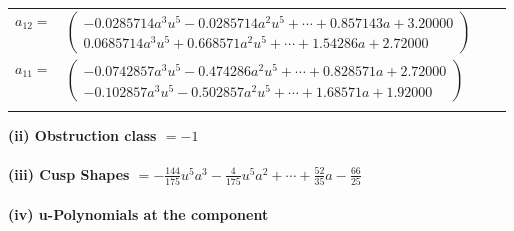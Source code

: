\documentclass[1p]{elsarticle_modified}
\theoremstyle{definition}
\begin{document}
\begin{tabular}{m{7pt} m{180pt} m{7pt} m{180pt} }
\flushright $a_{12}=$&$\begin{pmatrix}-0.0285714 a^{3} u^{5}-0.0285714 a^{2} u^{5}+\cdots+0.857143 a+3.20000\\0.0685714 a^{3} u^{5}+0.668571 a^{2} u^{5}+\cdots+1.54286 a+2.72000\end{pmatrix}$ \\
\flushright $a_{11}=$&$\begin{pmatrix}-0.0742857 a^{3} u^{5}-0.474286 a^{2} u^{5}+\cdots+0.828571 a+2.72000\\-0.102857 a^{3} u^{5}-0.502857 a^{2} u^{5}+\cdots+1.68571 a+1.92000\end{pmatrix}$\\&\end{tabular}
\flushleft \textbf{(ii) Obstruction class $= -1$}\\~\\
\flushleft \textbf{(iii) Cusp Shapes $= -\frac{144}{175} u^5 a^3-\frac{4}{175} u^5 a^2+\cdots+\frac{52}{35} a-\frac{66}{25}$}\\~\\
\newpage\renewcommand{\arraystretch}{1}
\flushleft \textbf{(iv) u-Polynomials at the component}\newline \\
\end{document}
